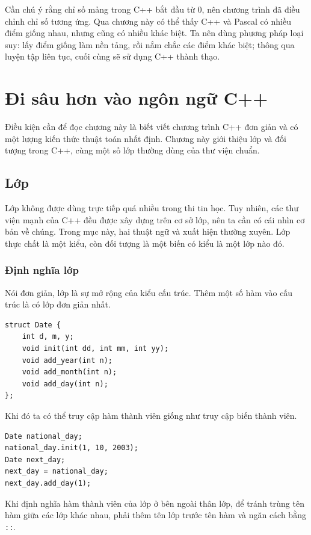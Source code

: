 \documentclass[11pt]{article}
\newcommand{\cpp}{C++}
\newcommand{\pascal}{Pascal}
\begin{document}
Cần chú ý rằng chỉ số mảng trong \cpp{} bắt đầu từ \(0\), nên chương trình đã
điều chỉnh chỉ số tương ứng. Qua chương này có thể thấy \cpp{} và \pascal{}
có nhiều điểm giống nhau, nhưng cũng có nhiều khác biệt. Ta nên dùng phương
pháp loại suy: lấy điểm giống làm nền tảng, rồi nắm chắc các điểm khác biệt;
thông qua luyện tập liên tục, cuối cùng sẽ sử dụng \cpp{} thành thạo.

\section{Đi sâu hơn vào ngôn ngữ \cpp{}}

Điều kiện cần để đọc chương này là biết viết chương trình \cpp{} đơn giản và
có một lượng kiến thức thuật toán nhất định. Chương này giới thiệu lớp và đối
tượng trong \cpp{}, cùng một số lớp thường dùng của thư viện chuẩn.

\subsection{Lớp}

Lớp không được dùng trực tiếp quá nhiều trong thi tin học. Tuy nhiên, các thư
viện mạnh của \cpp{} đều được xây dựng trên cơ sở lớp, nên ta cần có cái nhìn
cơ bản về chúng. Trong mục này, hai thuật ngữ  và 
xuất hiện thường xuyên. Lớp thực chất là một kiểu, còn đối tượng là một biến
có kiểu là một lớp nào đó.

\subsubsection*{Định nghĩa lớp}

Nói đơn giản, lớp là sự mở rộng của kiểu cấu trúc. Thêm một số hàm vào cấu
trúc là có lớp đơn giản nhất.

\begin{verbatim}
struct Date {
    int d, m, y;
    void init(int dd, int mm, int yy);
    void add_year(int n);
    void add_month(int n);
    void add_day(int n);
};
\end{verbatim}

Khi đó ta có thể truy cập hàm thành viên giống như truy cập biến thành viên.

\begin{verbatim}
Date national_day;
national_day.init(1, 10, 2003);
Date next_day;
next_day = national_day;
next_day.add_day(1);
\end{verbatim}

Khi định nghĩa hàm thành viên của lớp ở bên ngoài thân lớp, để tránh trùng tên
hàm giữa các lớp khác nhau, phải thêm tên lớp trước tên hàm và ngăn cách bằng
\verb|::|.
\end{document}
